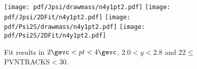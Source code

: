 \begin{figure}[H]
\begin{center}
\texttt{[image: pdf/Jpsi/drawmass/n4y1pt2.pdf]}
\texttt{[image: pdf/Jpsi/2DFit/n4y1pt2.pdf]}
\vspace*{-0.5cm}
\texttt{[image: pdf/Psi2S/drawmass/n4y1pt2.pdf]}
\texttt{[image: pdf/Psi2S/2DFit/n4y1pt2.pdf]}
\vspace*{-0.5cm}
\end{center}
\caption{Fit results in $2\gevc<pt<4\gevc$, $2.0<y<2.8$ and 22$\leq$PVNTRACKS$<$30.}
\label{Fitn4y1pt2}
\end{figure}
